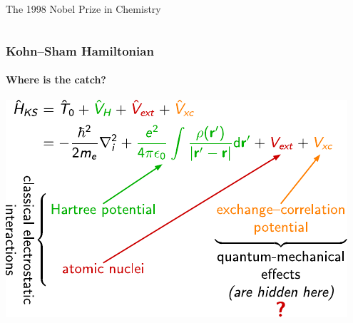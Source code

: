 \documentclass[noamsthm,8pt,t,xcolor={dvipsnames}]{beamer}
\begin{document}
\begin{frame}{The 1998 Nobel Prize in Chemistry}
\begin{columns}
\begin{column}{0.5\textwidth}
\begin{center}
         \end{center}
      \end{column}
   \end{columns}
\end{frame}

\begin{frame}
   \frametitle{Kohn--Sham Hamiltonian}
   \framesubtitle{Where is the catch?}
   \vspace{0.7cm}
   \begin{center}
      \includegraphics[width=0.7\linewidth]{figures/H.pdf}
   \end{center}
\end{frame}
\end{document}
